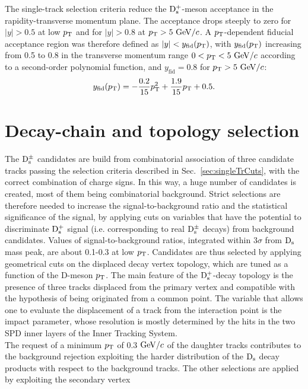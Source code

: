 The single-track selection criteria reduce the ${\rm D_s^+}$-meson acceptance
in the rapidity-transverse momentum plane. The acceptance drops 
steeply to zero for $|y| > 0.5$ at low $p_{\rm T}$ and for $|y| > 0.8$ 
at $p_{\rm T} > 5~\mathrm{GeV}/c$. A $p_{\rm T}$-dependent fiducial acceptance region was therefore defined as 
$|y| < y_{\mathrm{fid}}(p_{\rm T})$, with $y_{\mathrm{fid}}(p_{\rm T})$ increasing 
from 0.5 to 0.8 in the transverse momentum range $0 < p_{\rm T} < 5~\mathrm{GeV}/c$ 
according to a second-order polynomial function, and $y_{\mathrm{fid}}=0.8$ 
for $p_{\rm T} > 5~\mathrm{GeV}/c$:
\begin{equation}
\label{eq:yFid}
y_{\rm fid} (p_{\rm T}) = -\frac{0.2}{15}p_{\rm T}^2 + \frac{1.9}{15}p_{\rm T} + 0.5.
\end{equation}

\section{Decay-chain and topology selection}
\label{sec:topolPP}
The ${\rm D_s^{\pm}}$ candidates are build from combinatorial 
 association of three candidate tracks passing the selection criteria 
 described in Sec.~\ref{sec:singleTrCuts}, with the correct combination of charge 
 signs. In this way, a huge number of candidates is created, most of them 
 being combinatorial background. Strict selections are therefore needed to increase
 the signal-to-background ratio and the statistical significance of the signal,
 by applying cuts on variables that have the potential to discriminate
 ${\rm D_s^+}$ signal (i.e. corresponding to real ${\rm D_s^{\pm}}$ decays) 
 from background candidates. Values of signal-to-background ratios, integrated within
 3$\sigma$ from ${\rm D_s}$ mass peak, are about 0.1-0.3 at low $p_{\rm T}$. Candidates 
  are thus selected by applying geometrical cuts on the displaced decay vertex 
  topology, which are tuned as a function of the D-meson $p_{\rm T}$.
The main feature of the ${\rm D_s^+}$-decay topology is the presence of three tracks displaced from 
the primary vertex and compatible with the hypothesis of being originated from 
a common point. 
The variable that allows one to evaluate the displacement of a track from the interaction point is the 
impact parameter, whose resolution is mostly determined by the hits in the 
two SPD inner layers of the Inner Tracking System. \\
The request of a minimum $p_{\rm T}$ of 0.3 $\mathrm{GeV}/c$ of the daughter tracks contributes to 
the background rejection exploiting the harder distribution of
the ${\rm D_s}$ decay products with respect to the background tracks. 
The other selections are applied by exploiting the secondary vertex
